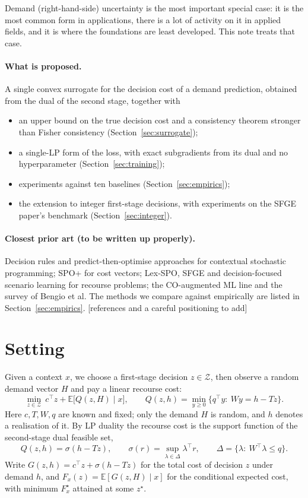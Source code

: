 \documentclass[11pt,a4paper]{article}
\theoremstyle{remark}
\newcommand{\E}{\mathbb E}
\newcommand{\Z}{\mathcal Z}
\newcommand{\todo}[1]{\textcolor{red!70!black}{[#1]}}
\begin{document}
Demand (right-hand-side) uncertainty is the most important special case:
it is the most common form in applications, there is a lot of activity on it in
applied fields, and it is where the foundations are least developed. This note
treats that case.

\paragraph{What is proposed.}
A single convex surrogate for the decision cost of a demand prediction,
obtained from the dual of the second stage, together with
\begin{itemize}
\item an upper bound on the true decision cost and a consistency theorem
      stronger than Fisher consistency (Section~\ref{sec:surrogate});
\item a single-LP form of the loss, with exact subgradients from its dual and no hyperparameter (Section~\ref{sec:training});
\item experiments against ten baselines (Section~\ref{sec:empirics});
\item the extension to integer first-stage decisions, with experiments on the SFGE paper's benchmark (Section~\ref{sec:integer}).
\end{itemize}

\paragraph{Closest prior art (to be written up properly).}
Decision rules and predict-then-optimise approaches for contextual stochastic
programming; SPO+ for cost vectors; Lex-SPO, SFGE and decision-focused scenario
learning for recourse problems; the CO-augmented ML line and the survey of
Bengio et al. The methods we compare against empirically are listed in
Section~\ref{sec:empirics}. \todo{references and a careful positioning to add}

\section{Setting}

Given a context $x$, we choose a first-stage decision $z\in\Z$, then observe a
random demand vector $H$ and pay a linear recourse cost:
\[
 \min_{z\in\Z}\ c^\top z+\E\bigl[Q(z,H)\mid x\bigr],
 \qquad
 Q(z,h)=\min_{y\ge0}\{q^\top y:\ Wy=h-Tz\}.
\]
Here $c,T,W,q$ are known and fixed; only the demand $H$ is random, and $h$ denotes a realisation of it. By LP duality the
recourse cost is the support function of the second-stage dual feasible set,
\[
 Q(z,h)=\sigma(h-Tz),\qquad
 \sigma(r)=\sup_{\lambda\in\Delta}\lambda^\top r,\qquad
 \Delta=\{\lambda:\ W^\top\lambda\le q\}.
\]
Write $G(z,h)=c^\top z+\sigma(h-Tz)$ for the total cost of decision $z$ under
demand $h$, and $F_x(z)=\E[G(z,H)\mid x]$ for the conditional expected cost,
with minimum $F_x^\star$ attained at some $z^\star$.
\end{document}
